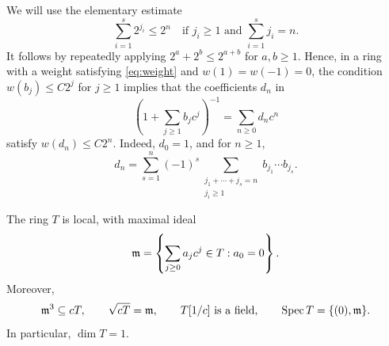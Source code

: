We will use the elementary estimate
\begin{equation}\label{eq:composition}
 \sum_{i=1}^{s}2^{j_i}\le2^n
 \quad\text{if }j_i\ge1\text{ and }\sum_{i=1}^{s}j_i=n.
\end{equation}
It follows by repeatedly applying $2^a+2^b\le2^{a+b}$ for
$a,b\ge1$. Hence, in a ring with a weight satisfying
\eqref{eq:weight} and $w(1)=w(-1)=0$, the condition
$w(b_j)\le C2^j$ for $j\ge1$ implies that the coefficients $d_n$ in
\begin{equation}\label{eq:reciprocal}
 \left(1+\sum_{j\ge1}b_jc^j\right)^{-1}=\sum_{n\ge0}d_nc^n
\end{equation}
satisfy $w(d_n)\le C2^n$. Indeed, $d_0=1$, and for $n\ge1$,
\[
 d_n=\sum_{s=1}^{n}(-1)^s
       \sum_{\substack{j_1+\cdots+j_s=n\\j_i\ge1}}
           b_{j_1}\cdots b_{j_s}.
\]

\begin{proposition}\label{prop:local}
The ring $T$ is local, with maximal ideal
\[
 \mathfrak m=\left\{\sum_{j\ge0}a_jc^j\in T:a_0=0\right\}.
\]
Moreover,
\begin{equation}\label{eq:local-properties}
 \mathfrak m^3\subseteq cT,\qquad \sqrt{cT}=\mathfrak m,\qquad
 T[1/c]\text{ is a field},\qquad \operatorname{Spec} T=\{(0),\mathfrak m\}.
\end{equation}
In particular, $\dim T=1$.
\end{proposition}

